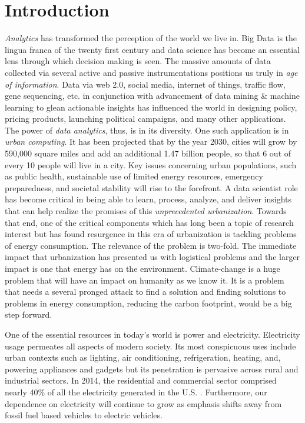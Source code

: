 \chapter{Introduction}

\emph{Analytics} has transformed the perception of the world we live in. Big Data is the lingua franca of the twenty first century and data science has become an essential lens through which decision making is seen. The massive amounts of data collected via several active and passive instrumentations positions us truly in \emph{age of information}. Data via web 2.0, social media, internet of things, traffic flow, gene sequencing, etc. in conjunction with advancement of data mining & machine learning to glean actionable insights has influenced the world in designing policy, pricing products, launching political campaigns, and many other applications. The power of \emph{data analytics}, thus, is in its diversity. One such application is in \emph{urban computing}. It has been projected that by the year 2030, cities will grow by 590,000 square miles and add an additional 1.47 billion people, so that 6 out of every 10 people will live in a city. Key issues concerning urban populations, such as public health, sustainable use of limited energy resources, emergency preparedness, and societal stability will rise to the forefront. A data scientist role has become critical in being able to learn, process, analyze, and deliver insights that can help realize the promises of this \emph{unprecedented urbanization}. Towards that end, one of the critical components which has long been a topic of research interest but has found resurgence in this era of urbanization is tackling problems of energy consumption. The relevance of the problem is two-fold. The immediate impact that urbanization has presented us with logistical problems and the larger impact is one that energy has on the environment. Climate-change is a huge problem that will have an impact on humanity as we know it. It is a problem that needs a several pronged attack to find a solution and finding solutions to problems in energy consumption, reducing the carbon footprint, would be a big step forward. 

One of the essential resources in today's world is power and electricity. Electricity usage permeates all aspects of modern society.
Its most conspicuous
uses include urban contexts such as
lighting, air conditioning, refrigeration, heating, and, powering
appliances and gadgets but its penetration is pervasive across rural
and industrial sectors.
In 2014, the residential and commercial sector
comprised nearly 40\% of all the electricity generated in the U.S. \cite{book2014us}.
Furthermore, our dependence on electricity will continue to grow
as emphasis shifts away from fossil fuel based vehicles to electric
vehicles.

